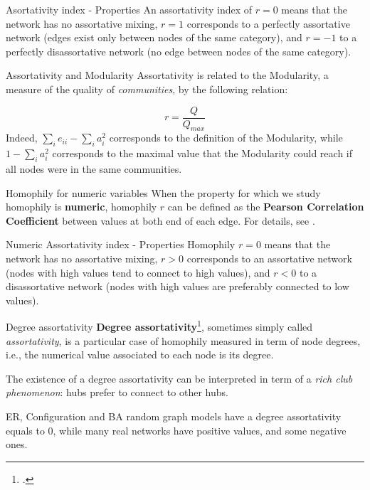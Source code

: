 \begin{textbox}{Asortativity index - Properties}
    An assortativity index of $r=0$ means that the network has no assortative mixing, $r=1$ corresponds to a perfectly assortative network (edges exist only between nodes of the same category), and $r=-1$ to a perfectly disassortative network (no edge between nodes of the same category).
\end{textbox}


\begin{textbox}{Assortativity and Modularity}
    Assortativity is related to the Modularity, a measure of the quality of \textit{communities}, by the following relation:

    \[
        r=\frac{Q}{Q_{max}}
    \]
    Indeed, $\sum_i e_{ii} - \sum_i a_i^2$ corresponds to the definition of the Modularity, while $1- \sum_i a_i^2$ corresponds to the maximal value that the Modularity could reach if all nodes were in the same communities.
\end{textbox}


\begin{textbox}{Homophily for numeric variables}
    When the property for which we study homophily is \textbf{numeric}, homophily $r$ can be defined as the \textbf{Pearson Correlation Coefficient} between values at both end of each edge. For details, see \cite{newman2003mixing}.
\end{textbox}


\begin{textbox}{Numeric Assortativity index - Properties}
    Homophily $r=0$ means that the network has no assortative mixing, $r>0$ corresponds to an assortative network (nodes with high values tend to connect to high values), and $r<0$ to a disassortative network (nodes with high values are preferably connected to low values).
\end{textbox}


\begin{textbox}{Degree assortativity}
    \textbf{Degree assortativity}\footcite{newman2003mixing}, sometimes simply called \textit{assortativity}, is a particular case of homophily measured  in term of node degrees, i.e., the numerical value associated to each node is its degree.

    The existence of a degree assortativity can be interpreted in term of a \textit{rich club phenomenon}: hubs prefer to connect to other hubs.

    ER, Configuration and BA random graph models have a degree assortativity equals to 0, while many real networks have positive values, and some negative ones.
\end{textbox}


